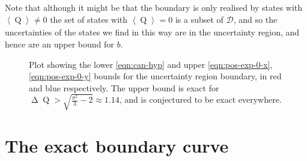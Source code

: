 \documentclass[prb,amsmath,amssymb,notitlepage]{revtex4-1}
\newcommand{\sdev}[1]{\operatorname{\Delta} #1} %
\newcommand{\var}[2]{\operatorname{\Delta^{\!2}_{{#2}}} #1}
\newcommand{\expe}[2]{\left\langle #1\right\rangle_{#2}}
\newcommand{\ps}[1]{\psi_{#1}}
\DeclareMathOperator{\opp}{P}
\DeclareMathOperator{\opq}{Q}
\begin{document}
Note that although it might be that the boundary is only realised by states with $\expe{\opq}{} \neq 0$ the set of states with $\expe{\opq}{} = 0$ is a subset of $\mathcal{D}$, and so the uncertainties of the states we find in this way are in the uncertainty region, and hence are an upper bound for $b$.


\begin{figure}
	\caption{Plot showing the lower \eqref{eqn:can-hyp} and upper \eqref{eqn:pos-exp-0-x}, \eqref{eqn:pos-exp-0-y} bounds for the uncertainty region boundary, in red and blue respectively. The upper bound is exact for $\sdev{\opq} > \sqrt{\frac{\pi^2}{3} - 2}\approx 1.14$, and is conjectured to be exact everywhere.}
\end{figure}
\FloatBarrier
\section{The exact boundary curve}
\end{document}
